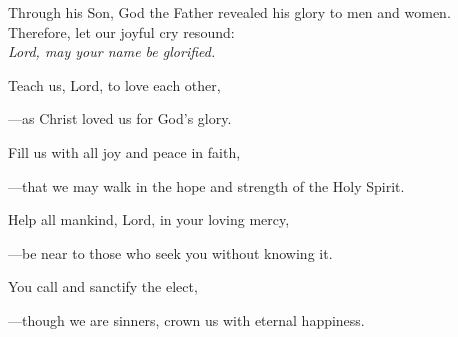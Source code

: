 \intercessions\indent

\begin{hangpar}

Through his Son, God the Father revealed his glory to men and women. Therefore, let our joyful cry resound:\\
\emph{Lord, may your name be glorified.}

\medskip Teach us, Lord, to love each other,

{\color{red}---\thinspace}as Christ loved us for God’s glory.

\medskip Fill us with all joy and peace in faith,

{\color{red}---\thinspace}that we may walk in the hope and strength of the Holy Spirit.

\medskip Help all mankind, Lord, in your loving mercy,

{\color{red}---\thinspace}be near to those who seek you without knowing it.

\medskip You call and sanctify the elect,

{\color{red}---\thinspace}though we are sinners, crown us with eternal happiness.

\end{hangpar}